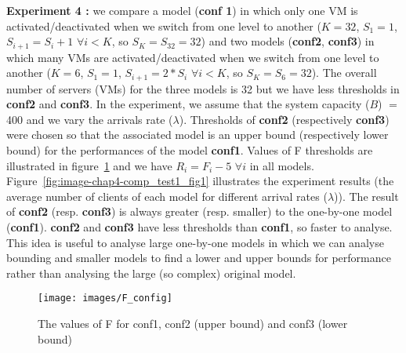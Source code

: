 \documentclass[conference]{IEEEtran}
\begin{document}
\textbf{Experiment 4 :} we compare a model (\textbf{conf 1}) in which only one VM is activated/deactivated when we switch from one level to another  ($K=32$, $S_1=1$, $S_{i+1}=S_{i}+1$ $\forall i<K$, so $S_{K}=S_{32}=32$) and two models (\textbf{conf2}, \textbf{conf3}) in which many VMs are activated/deactivated when we switch from one level to another ($K=6$, $S_1=1$, $S_{i+1}=2*S_{i}$ $\forall i<K$, so $S_{K}=S_{6}=32$). The overall number of servers (VMs) for the three models is 32 but we have less thresholds in \textbf{conf2} and \textbf{conf3}. In the experiment, we assume that the system capacity ($B$) $=$ 400 and we vary the arrivals rate ($\lambda$). Thresholds of \textbf{conf2} (respectively \textbf{conf3}) were chosen so that the associated model is an upper bound (respectively lower bound) for the performances of the model \textbf{conf1}. Values of F thresholds are illustrated in figure~\ref{fig:fconfig} and we have $R_{i}=F_{i}-5$ $\forall i$ in all models. Figure~\ref{fig:image-chap4-comp_test1_fig1} illustrates the experiment results (the average number of clients of each model for different arrival rates ($\lambda$)). The result of \textbf{conf2}  (resp. \textbf{conf3}) is always greater (resp. smaller) to the one-by-one model (\textbf{conf1}). \textbf{conf2} and \textbf{conf3} have less thresholds than \textbf{conf1}, so faster to analyse. This idea is useful to analyse large one-by-one models in which we can analyse bounding and smaller models to find a lower and upper bounds for performance rather than analysing the large (so complex) original model. 

\begin{figure}[!t]
\centering
\texttt{[image: images/F\_config]}
\caption{The values of F for conf1, conf2 (upper bound) and conf3 (lower bound)}
\label{fig:fconfig}
\end{figure}
\end{document}

